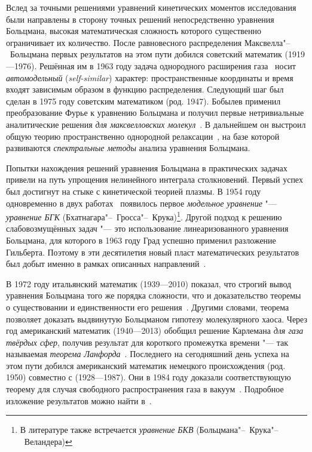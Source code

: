 \documentclass[a4paper, 12pt, oneside]{article} %
\begin{document}
Вслед за точными решениями уравнений кинетических моментов исследования
были направлены в сторону точных решений непосредственно уравнения
Больцмана, высокая математическая сложность которого существенно
ограничивает их количество. После равновесного распределения
Максвелла"--~Больцмана первых результатов на этом пути добился советский
математик  (1919---1976). Решённая им в
1963 году задача однородного расширения
газа~\cite{nikolskii1963selfsimilar} носит \emph{автомодельный}
(\emph{self-similar}) характер: пространственные координаты и время
входят зависимым образом в функцию распределения. Следующий шаг был
сделан в 1975 году советским математиком  (род. 1947).
Бобылев применил преобразование Фурье к уравнению Больцмана и получил
первые нетривиальные аналитические решения \emph{для максвелловских
молекул}~\cite{bobylev1975solution}. В дальнейшем он выстроил общую
теорию пространственно однородной релаксации~\cite{bobylev1984exact}, на
базе которой развиваются \emph{спектральные методы} анализа уравнения
Больцмана. 

Попытки нахождения решений уравнения Больцмана в практических задачах
привели на путь упрощения нелинейного интеграла столкновений. Первый
успех был достигнут на стыке с кинетической теорией плазмы. В 1954 году
одновременно в двух работах~\cite{bhatnagar1954model,
welander1954temperature} появилось первое \emph{модельное уравнение}
"--- \emph{уравнение БГК} (Бхатнагара"--~Гросса"--~Крука)\footnote{В
литературе также встречается \emph{уравнение БКВ}
(Больцмана"--~Крука"--~Веландера)}. Другой подход к решению
слабовозмущённых задач "--- это использование линеаризованного уравнения
Больцмана, для которого в 1963 году Град успешно применил разложение
Гильберта. Поэтому в эти десятилетия новый пласт математических
результатов был добыт именно в рамках описанных
направлений~\cite{cercignani1973mathematical}.

В 1972 году итальянский математик 
(1939---2010) показал, что строгий вывод уравнения Больцмана того же
порядка сложности, что и доказательство теоремы о существовании и
единственности его решения~\cite{cercignani1972boltzmann}. Другими
словами, теорема позволяет доказать выдвинутую Больцманом гипотезу
молекулярного хаоса. Через год американский математик  (1940---2013) обобщил решение Карлемана \emph{для газа твёрдых
сфер}, получив результат для короткого промежутка времени "--- так
называемая \emph{теорема Ланфорда}~\cite{lanford1975time}. Последнего на
сегодняшний день успеха на этом пути добился американский математик
немецкого происхождения  (род. 1950) совместно с
 (1928---1987). Они в 1984 году доказали
соответствующую теорему для случая свободного распространения газа в
вакуум~\cite{illner1984boltzmann}. Подробное изложение результатов можно
найти в~\cite{cercignani1994mathematical}.
\end{document}
